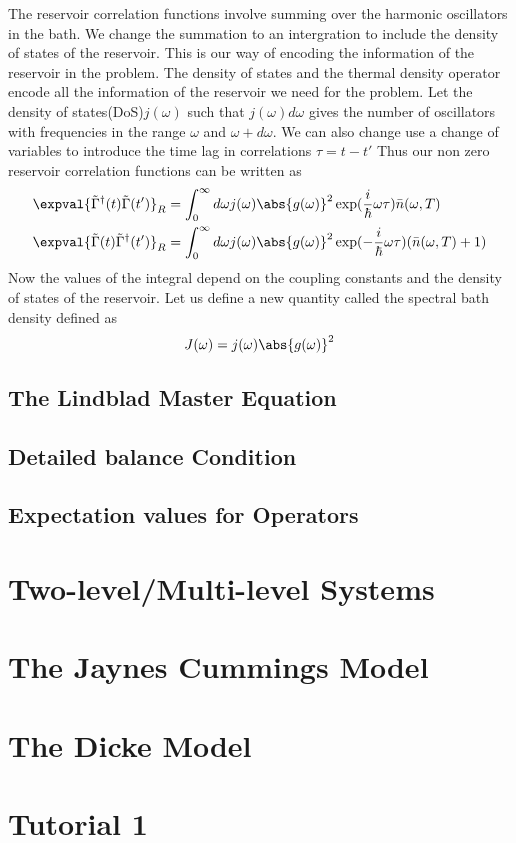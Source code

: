 \documentclass{scrartcl}
\newcommand{\1}{\mathbbm{1}}
\newcommand{\iG}{\tilde{\Gamma}}
\newcommand{\nbar}{\bar{n}}
\begin{document}
The reservoir correlation functions involve summing over the harmonic oscillators in the bath. We change the summation
to an intergration to include the density of states of the reservoir. This is our way of encoding the
information of the reservoir in the problem. The density of states and the thermal density operator encode
all the information of the reservoir we need for the problem. Let the density of states(DoS)\(j(\omega)\) such that
\(j(\omega) d\omega\) gives the number of oscillators with frequencies in the range \(\omega\) and \(\omega + d\omega\). We can also
change use a change of variables to introduce the time lag in correlations \(\tau = t-t'\)
Thus our non zero reservoir correlation functions can be written as
\begin{align}
	\expval{\iG^\dagger(t)\iG(t')}_R & = \int_0^\infty d\omega j(\omega) \abs{g(\omega)}^2 \exp(\frac{i}{\hbar} \omega \tau) \nbar(\omega,T) \label{eq: rescorr1}\\
	\expval{\iG(t)\iG^\dagger(t')}_R & = \int_0^\infty d\omega j(\omega) \abs{g(\omega)}^2 \exp(-\frac{i}{\hbar} \omega \tau) (\nbar(\omega,T)+1)
\end{align}
Now the values of the integral depend on the coupling constants and the density of states of the reservoir. Let us define a new quantity called the spectral bath density
defined as 
\begin{equation}
	J(\omega) = j(\omega) \abs{g(\omega)}^2	
\end{equation}


\subsection{The Lindblad Master Equation}
\subsection{Detailed balance Condition}
\subsection{Expectation values for Operators}
\section{Two-level/Multi-level Systems}
\section{The Jaynes Cummings Model}
\section{The Dicke Model}
\section{Tutorial 1}
\end{document}
